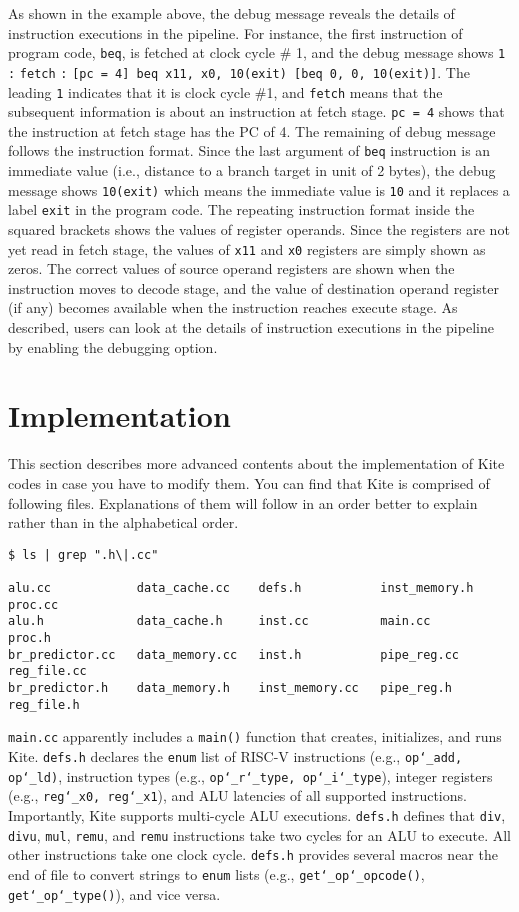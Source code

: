 \documentclass[10pt]{article}
\begin{document}
As shown in the example above, the debug message reveals the details of instruction executions in the pipeline.
For instance, the first instruction of program code, {\tt beq}, is fetched at clock cycle \# 1, and the debug message shows {\tt 1} {\tt :} {\tt fetch} {\tt :} {\tt[pc = 4] beq x11, x0, 10(exit) [beq 0, 0, 10(exit)]}.
The leading {\tt 1} indicates that it is clock cycle \#1, and {\tt fetch} means that the subsequent information is about an instruction at fetch stage.
{\tt pc = 4} shows that the instruction at fetch stage has the PC of 4.
The remaining of debug message follows the instruction format.
Since the last argument of {\tt beq} instruction is an immediate value (i.e., distance to a branch target in unit of 2 bytes), the debug message shows {\tt 10(exit)} which means the immediate value is {\tt 10} and it replaces a label {\tt exit} in the program code.
The repeating instruction format inside the squared brackets shows the values of register operands.
Since the registers are not yet read in fetch stage, the values of {\tt x11} and {\tt x0} registers are simply shown as zeros.
The correct values of source operand registers are shown when the instruction moves to decode stage, and the value of destination operand register (if any) becomes available when the instruction reaches execute stage.
As described, users can look at the details of instruction executions in the pipeline by enabling the debugging option.

\section{Implementation} \label{sec:implementation}
This section describes more advanced contents about the implementation of Kite codes in case you have to modify them.
You can find that Kite is comprised of following files.
Explanations of them will follow in an order better to explain rather than in the alphabetical order.
\begin{Verbatim}[frame=single,fontsize=\small]
$ ls | grep ".h\|.cc"

alu.cc            data_cache.cc    defs.h           inst_memory.h   proc.cc
alu.h             data_cache.h     inst.cc          main.cc         proc.h
br_predictor.cc   data_memory.cc   inst.h           pipe_reg.cc     reg_file.cc
br_predictor.h    data_memory.h    inst_memory.cc   pipe_reg.h      reg_file.h
\end{Verbatim}

{\tt main.cc} apparently includes a {\tt main()} function that creates, initializes, and runs Kite.
{\tt defs.h} declares the {\tt enum} list of RISC-V instructions (e.g., {\tt op\char`_add, op\char`_ld)}, instruction types (e.g., {\tt op\char`_r\char`_type, op\char`_i\char`_type}), integer registers (e.g., {\tt reg\char`_x0, reg\char`_x1}), and ALU latencies of all supported instructions.
Importantly, Kite supports multi-cycle ALU executions.
{\tt defs.h} defines that {\tt div}, {\tt divu}, {\tt mul}, {\tt remu}, and {\tt remu} instructions take two cycles for an ALU to execute.
All other instructions take one clock cycle.
{\tt defs.h} provides several macros near the end of file to convert strings to {\tt enum} lists (e.g., {\tt get\char`_op\char`_opcode()}, {\tt get\char`_op\char`_type()}), and vice versa.
\end{document}
